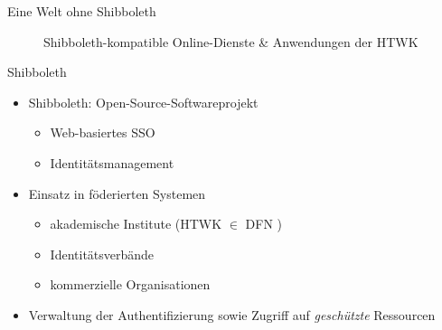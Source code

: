 \begin{frame}{Eine Welt ohne Shibboleth}
\begin{figure}
        \caption{Shibboleth-kompatible Online-Dienste \& Anwendungen der HTWK~\cite{hochschulefuertechnikwirtschaftundkulturleipzigMedienOnlineNutzen}}
    \end{figure}
\end{frame}


\begin{frame}{Shibboleth}
    \begin{itemize}
        \item \alert{Shibboleth}: Open-Source-Softwareprojekt
        \begin{itemize}
            \item Web-basiertes SSO
            \item Identitätsmanagement \cite{cantorConsortiumFAQShibboleth2023, shibbolethShibbolethConsortium2024}
        \end{itemize}

        \pause

        \item Einsatz in föderierten Systemen
        \begin{itemize}
            \item akademische Institute (HTWK $\in$ DFN \cite{hochschulefuertechnikwirtschaftundkulturleipzigMedienOnlineNutzen})
            \item Identitätsverbände
            \item kommerzielle Organisationen \cite{shibbolethOurMembers2024, shibbolethShibbolethConsortium2024}
        \end{itemize}

        \pause

        \item Verwaltung der Authentifizierung sowie Zugriff auf \emph{geschützte} Ressourcen \cite{cantorConsortiumFAQShibboleth2023}
    \end{itemize}
\end{frame}
